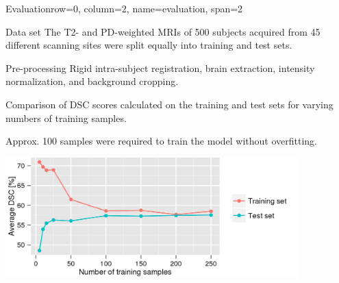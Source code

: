 \documentclass[%
portrait,paperwidth=841mm,paperheight=1180mm,%
margin=2cm,
fontscale=0.32
]{baposter}
\begin{document}
\begin{poster}
\begin{headerblock}{Evaluation}{row=0, column=2, name=evaluation, span=2}
\begin{compactdesc}
\item[Data set] The T2- and PD-weighted MRIs of 500 subjects acquired from 45
different scanning sites were split equally into training and test sets.
\item[Pre-processing] Rigid intra-subject registration, brain extraction,
intensity normalization, and background cropping.
\end{compactdesc}
\begin{compactitem}
\item Comparison of DSC scores calculated on the training and test sets for
varying numbers of training samples.
\item Approx. 100 samples were required to train the model without
overfitting.
\end{compactitem}
\begin{center}
\includegraphics[width=0.85\textwidth]{figures/train_count}
\end{center}
\end{headerblock}




\end{poster}
\end{document}
